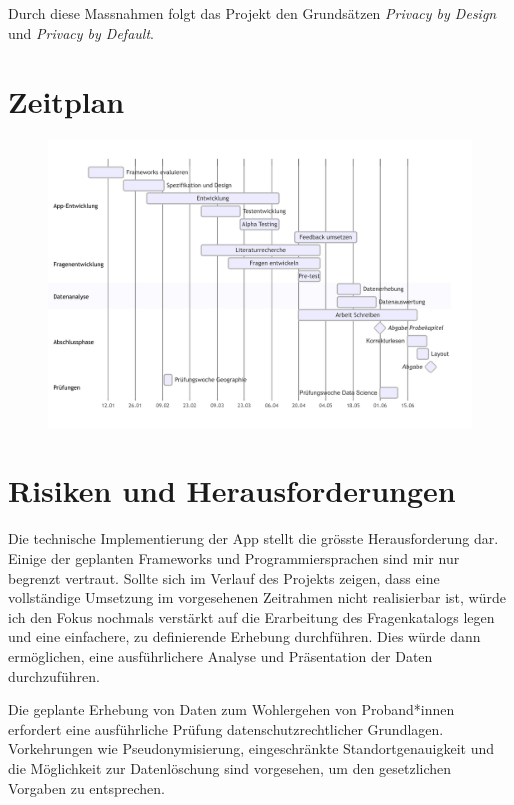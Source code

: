 \documentclass{template}
\begin{document}
Durch diese Massnahmen folgt das Projekt den Grundsätzen \textit{Privacy by Design} und \textit{Privacy by Default}.

\section{Zeitplan}

\begin{figure}[H]
    \centering
    \includegraphics[width=1\linewidth]{Proposal/Timeline_BA_Lukas_Batschelet-2025-01-20-102140.png}
    \label{fig:timeline}
\end{figure}


\section{Risiken und Herausforderungen}

Die technische Implementierung der App stellt die grösste Herausforderung dar. Einige der geplanten Frameworks und Programmiersprachen sind mir nur begrenzt vertraut. Sollte sich im Verlauf des Projekts zeigen, dass eine vollständige Umsetzung im vorgesehenen Zeitrahmen nicht realisierbar ist, würde ich den Fokus nochmals verstärkt auf die Erarbeitung des Fragenkatalogs legen und eine einfachere, zu definierende Erhebung durchführen. Dies würde dann ermöglichen, eine ausführlichere Analyse und Präsentation der Daten durchzuführen.

Die geplante Erhebung von Daten zum Wohlergehen von Proband*innen erfordert eine ausführliche Prüfung datenschutzrechtlicher Grundlagen. Vorkehrungen wie Pseudonymisierung, eingeschränkte Standortgenauigkeit und die Möglichkeit zur Datenlöschung sind vorgesehen, um den gesetzlichen Vorgaben zu entsprechen.
\end{document}
